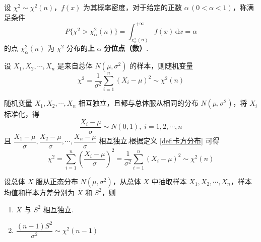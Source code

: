 \begin{definition}
    设 $\chi^2 \sim \chi^2(n)$，$f(x)$ 为其概率密度，对于给定的正数 $\alpha \, (0 < \alpha < 1)$，称满足条件
    $$
    P \{ \chi^2 > \chi_{\alpha}^2(n) \} = \int_{\chi_{\alpha}^2(n)}^{+\infty} f(x) \, \text{d}x = \alpha
    $$
    的点 $\chi_{\alpha}^2(n)$ 为 $\chi^2$ 分布的\textbf{上} $\alpha$ \textbf{分位点（数）}.
\end{definition}

\begin{theorem} \label{theorem:来自正态总体的样本标准化后求和，服从卡方分布}
    设 $X_1,X_2,\cdots,X_n$ 是来自总体 $N(\mu,\sigma^2)$ 的样本，则随机变量
    $$
    \chi^2 = \dfrac{1}{\sigma^2} \sum_{i=1}^n (X_i - \mu)^2 \sim \chi^2(n)
    $$
\end{theorem}

\begin{myproof}
    随机变量 $X_1,X_2,\cdots,X_n$ 相互独立，且都与总体服从相同的分布 $N(\mu,\sigma^2)$，将 $X_i$ 标准化，得
    $$
    \dfrac{X_i - \mu}{\sigma} \sim N(0,1), \; i=1,2,\cdots,n
    $$
    且 $\dfrac{X_1 - \mu}{\sigma}, \dfrac{X_2 - \mu}{\sigma},\cdots, \dfrac{X_n - \mu}{\sigma}$ 相互独立.根据定义 \ref{def:卡方分布} 可得
    $$
    \chi^2 = \sum_{i=1}^n \left( \dfrac{X_i - \mu}{\sigma} \right)^2 = \dfrac{1}{\sigma^2} \sum_{i=1}^n (X_i - \mu)^2 \sim \chi^2(n)
    $$
\end{myproof}

\begin{theorem} \label{theorem:正态总体的样本均值与样本方差相互独立}
    设总体 $X$ 服从正态分布 $N(\mu,\sigma^2)$，从总体 $X$ 中抽取样本 $X_1,X_2,\cdots,X_n$，样本均值和样本方差分别为 $\overline{X}$ 和 $S^2$，则

    \begin{enumerate}
        \item $\overline{X}$ 与 $S^2$ 相互独立. \vspace{0.5em}
        \item $\dfrac{(n-1) S^2}{\sigma^2} \sim \chi^2(n-1)$
    \end{enumerate}
\end{theorem}

\vspace{-1.8em}

